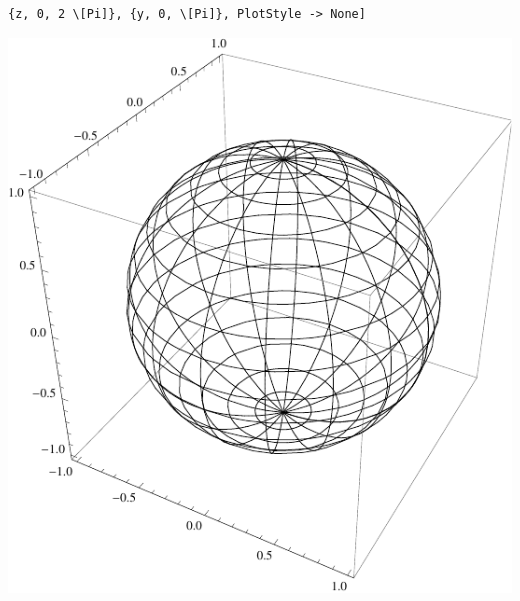 \documentclass[10pt,a4paper,parskip=half]{scrartcl}
\begin{document}
\begin{enumerate}[$\quad$]
\begin{minipage}{0.50\columnwidth}
\begin{lstlisting}[caption= Mathematica Code für den Graph von f]
	{z, 0, 2 \[Pi]}, {y, 0, \[Pi]}, PlotStyle -> None]
	\end{lstlisting}
	\end{minipage}
	\begin{minipage}{0.50\columnwidth}
	\begin{center}
	\includegraphics[scale=0.7]{rkonstant.pdf} 
	\end{center}
	\end{minipage}

\end{enumerate}
\end{document}
